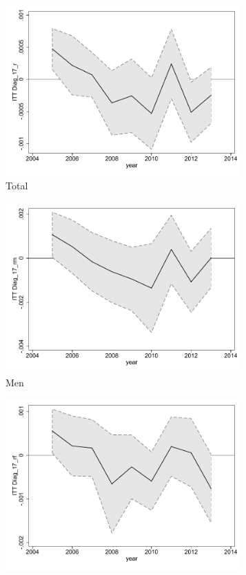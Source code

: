 \documentclass[a4paper ]{article}
\begin{document}
\begin{figure}[h!]
	\centering
	\begin{subfigure}[t]{0.31\textwidth}
		\centering
		\includegraphics[width=0.99\textwidth]{R1_LC_Diag_17_r}
		\caption{Total}		
	\end{subfigure}
	\begin{subfigure}[t]{0.31\textwidth}
		\centering
		\includegraphics[width=0.99\textwidth]{R1_LC_Diag_17_rm}
		\caption{Men}		
	\end{subfigure}
	\quad
	\begin{subfigure}[t]{0.31\textwidth}
		\centering
		\includegraphics[width=0.99\textwidth]{R1_LC_Diag_17_rf}

\end{subfigure}
\end{figure}
\end{document}
